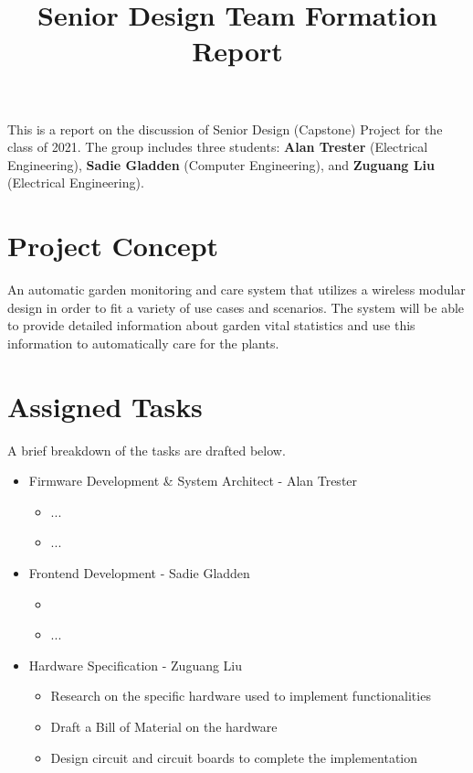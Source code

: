 \documentclass[]{article}
\title{Senior Design Team Formation Report}
\begin{document}
\maketitle

This is a report on the discussion of Senior Design (Capstone) Project for the class of 2021. The group includes three students: \textbf{Alan Trester} (Electrical Engineering), \textbf{Sadie Gladden} (Computer Engineering), and \textbf{Zuguang Liu} (Electrical Engineering).

\section{Project Concept}
An automatic garden monitoring and care system that utilizes a wireless modular design in order to fit a variety of use cases and scenarios. The system will be able to provide detailed information about garden vital statistics and use this information to automatically care for the plants.
\section{Assigned Tasks}
A brief breakdown of the tasks are drafted below.
\begin{itemize}

	\item Firmware Development \& System Architect - Alan Trester
	\begin{itemize}
		\item ...
		\item ...
	\end{itemize}

	\item Frontend Development - Sadie Gladden
	\begin{itemize}
		\item  
		\item ... 
	\end{itemize}

	\item Hardware Specification - Zuguang Liu
	\begin{itemize}
		\item Research on the specific hardware used to implement functionalities
		\item Draft a Bill of Material on the hardware
		\item Design circuit and circuit boards to complete the implementation
	\end{itemize}

\end{itemize}
\end{document}
